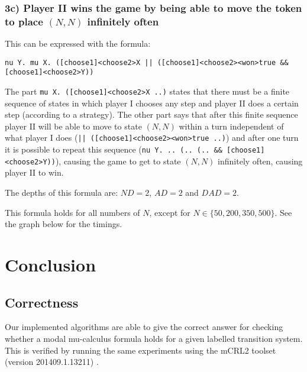 \documentclass[10pt,a4paper]{article}
\begin{document}
\subsubsection{3c) Player II wins the game by being able to move the token to place $(N, N)$ infinitely often}\label{board3}
This can be expressed with the formula:

\begin{center}
	{\tt nu Y. mu X. ([choose1]<choose2>X || ([choose1]<choose2><won>true \&\& [choose1]<choose2>Y))}
\end{center}

The part {\tt mu X. ([choose1]<choose2>X ..)} states that there must be a finite sequence of states in which player I chooses any step and player II does a certain step (according to a strategy). The other part says that after this finite sequence player II will be able to move to state $(N, N)$ within a turn independent of what player I does ({\tt || ([choose1]<choose2><won>true ..)}) and after one turn it is possible to repeat this sequence ({\tt nu Y. .. (.. (.. \&\& [choose1]<choose2>Y))}), causing the game to get to state $(N, N)$ infinitely often, causing player II to win.

The depths of this formula are: $ND = 2$, $AD = 2$ and $DAD = 2$.

This formula holds for all numbers of $N$, except for $N \in \{50, 200, 350, 500\}$. See the graph below for the timings.



\section{Conclusion}\label{conc}

\subsection{Correctness}
Our implemented algorithms are able to give the correct answer for checking whether a modal mu-calculus formula holds for a given labelled transition system. This is verified by running the same experiments using the mCRL2 toolset (version 201409.1.13211) \cite{mcrl2}.
\end{document}

